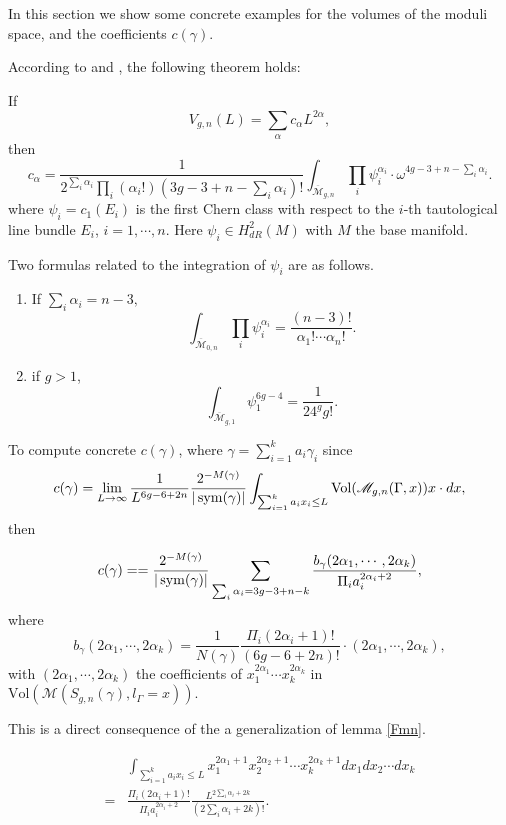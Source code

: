 In this section we show some concrete examples for the volumes of  the moduli space, and the coefficients $c(\gamma)$.

According to \cite{Mirzakhani:2006fta} and \cite{Mirzakhani:2006eta}, the following  theorem holds:
\begin{theorem}
If $$V_{g,n}(L)=\sum_\alpha c_\alpha L^{2\alpha},$$
 then $$
 c_\alpha=\frac{1}{2^{\sum_i{\alpha_i}}\prod_i(\alpha_i!)(3g-3+n-\sum_i\alpha_i)!}\int_{\overline{\mathscr{M}}_{g,n}}\prod_i\psi_i^{\alpha_i}\cdot \omega^{4g-3+n-\sum_i\alpha_i}.
 $$
 where $\psi_i=c_1(E_i)$ is the first Chern class with respect to the $i$-th tautological line bundle $E_i$, $i=1,\cdots, n$. Here  $\psi_i\in H_{dR}^2(M)$ with $M$ the base manifold. 
 
\end{theorem}


Two formulas related to  the integration of $\psi_i$ are as follows.
\begin{enumerate}
    \item If $\sum_i\alpha_i=n-3,$
    $$\int_{\overline{\mathscr{M}}_{0,n}}\prod_i\psi_i^{\alpha_i}=\frac{(n-3)!}{\alpha_1!\cdots \alpha_n!}.$$ 
    \item     if $g>1$, $$
    \int_{\overline{\mathscr{M}}_{g,1}}\psi_1^{6g-4}=\frac{1}{24^gg!}.
    $$
\end{enumerate}

To compute concrete $c(\gamma)$, where $\gamma=\sum_{i=1}^ka_i\gamma_i$  since $$
c(\gamma)=\lim_{L\to \infty}\frac{1}{L^{6g-6+2n}}\frac{2^{-M(\gamma)}}{|\operatorname{sym}(\gamma)|}\int_{\sum_{i=1}^ka_ix_i\leq L}\mathrm{Vol}(\mathscr{M}_{g,n}(\Gamma,x))x\cdot dx,
$$
 then 
 \begin{theorem}
 \begin{equation}\label{cgammafor}
     c(\gamma)==\frac{2^{-M(\gamma)}}{|\operatorname{sym}(\gamma)|}\sum_{\sum_i\alpha_i=3g-3+n-k}\frac{b_\gamma(2\alpha_1,\cdots,2\alpha_k)}{\Pi_ia_i^{2\alpha_i+2}},
 \end{equation}
where $$b_\gamma(2\alpha_1,\cdots,2\alpha_k)=\frac{1}{N(\gamma)}\frac{\Pi_i(2\alpha_i+1)!}{(6g-6+2n)!}\cdot (2\alpha_1,\cdots,2\alpha_k),$$
with $(2\alpha_1,\cdots,2\alpha_k)$  the coefficients of $x_1^{2\alpha_1}\cdots x_k^{2\alpha_k}$ in $\mathrm{Vol}(\mathscr{M}(S_{g,n}(\gamma),l_\Gamma=x))$.
 \end{theorem}
 
 This is a direct consequence of  the a generalization of lemma \ref{Fmn}.
 
 \begin{lemma}
 \begin{equation}
     \begin{aligned}
      &\int_{\sum_{i=1}^ka_ix_i\leq L}x_1^{2\alpha_1+1}x_2^{2\alpha_2+1}\cdots x_k^{2\alpha_k+1} dx_1dx_2\cdots dx_k\\
      =&\frac{\Pi_i(2\alpha_i+1)!}{\Pi_ia_i^{2\alpha_i+2}}\frac{L^{2\sum_i\alpha_i+2k}}{(2\sum_i\alpha_i+2k)!}.\\
     \end{aligned}
 \end{equation}
 \end{lemma}
 

